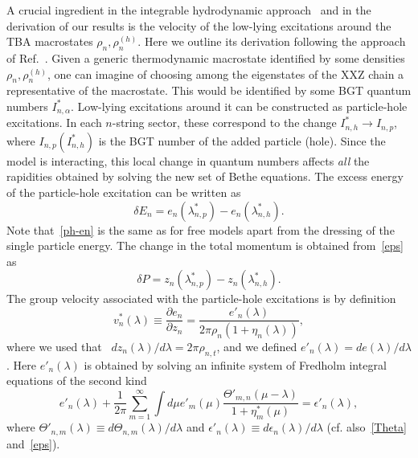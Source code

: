 \documentclass[twocolumn,superscriptaddress,prb,10pt]{revtex4-1}
\begin{document}
A crucial ingredient in the integrable hydrodynamic approach~\cite{olalla-2016,bertini-2016} 
and in the derivation of our results is the velocity of the low-lying excitations 
around the TBA macrostates $\rho_n,\rho_n^{\scriptscriptstyle (h)}$. Here we outline 
its derivation following the approach of Ref.~. 
Given a generic thermodynamic macrostate identified by some densities $\rho_n,
\rho_n^{\scriptscriptstyle(h)}$, one can imagine 
of choosing among the eigenstates of the XXZ chain a representative of the macrostate.  
This would be identified by some BGT quantum numbers $I_{n,\alpha}^*$. Low-lying excitations around 
it can be constructed as particle-hole excitations. In each $n$-string sector, these correspond to 
the change $I^*_{n,h}\to I_{n,p}$, where $I_{n,p}(I^*_{n,h})$ 
is the BGT number of the added particle (hole). Since the model is interacting, 
this local change in quantum numbers affects {\it all} the rapidities obtained by solving the 
new set of Bethe equations. The excess energy 
of the particle-hole excitation can be written as~\cite{bonnes-2014} 
%
\begin{equation}
\label{ph-en}
\delta E_n=e_n(\lambda^*_{n,p})-e_n(\lambda^*_{n,h}). 
\end{equation}
%
Note that~\eqref{ph-en}  is the same as for free models apart from the dressing of the 
single particle energy. The change in the total momentum is obtained from~\eqref{eps} as 
%
\begin{equation}
	\delta P=z_n(\lambda^*_{n,p})-z_n(\lambda^*_{n,h}). 
\end{equation}
%
The group velocity associated with the particle-hole excitations is by definition  
%
\begin{equation}
\label{group-v}
v^*_n(\lambda)\equiv\frac{\partial e_n}{\partial z_n}=\frac{e'_n(\lambda)}{2\pi
\rho_{n}(1+\eta_n(\lambda))}, 
\end{equation}
%
where we used that~\cite{taka-book} $d z_n(\lambda)/d\lambda=2\pi\rho_{n,t}$, and 
we defined $e'_n(\lambda)=de(\lambda)/d\lambda$. Here $e'_n(\lambda)$ is 
obtained by solving an infinite system of Fredholm integral equations of the second 
kind~\cite{bonnes-2014}  
%
\begin{equation}
\label{tosolve}
e'_n(\lambda)+\frac{1}{2\pi}\sum\limits_{m=1}^\infty\int\!d\mu e'_m
(\mu)\frac{\Theta'_{m,n}(\mu-\lambda)}{1+\eta^*_m(\mu)}=
\epsilon'_n(\lambda),
\end{equation}
%
where $\Theta'_{n,m}(\lambda)\equiv d\Theta_{n,m}(\lambda)/d\lambda$ and 
$\epsilon'_n(\lambda)\equiv d\epsilon_n(\lambda)/d\lambda$  (cf. also~\eqref{Theta}
and~\eqref{eps}).  
\end{document}
